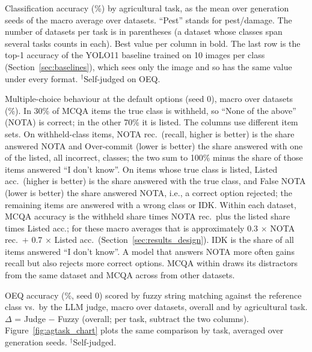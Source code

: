 \documentclass[10pt,letterpaper]{article}
\newcommand{\tablefont}{\footnotesize}
\begin{document}
\begin{table}[!tbp]
\centering
\caption{Classification accuracy (\%) by agricultural task, as the mean over generation seeds of the macro average over datasets. ``Pest'' stands for pest/damage. The number of datasets per task is in parentheses (a dataset whose classes span several tasks counts in each). Best value per column in bold. The last row is the top-1 accuracy of the YOLO11 baseline trained on 10 images per class (Section~\ref{sec:baselines}), which sees only the image and so has the same value under every format. $^\dagger$Self-judged on OEQ.}
\label{tab:agtask}
\renewcommand{\arraystretch}{1.2}
\tablefont

\end{table}

\begin{table}[!tbp]
\centering
\caption{Multiple-choice behaviour at the default options (seed 0), macro over datasets (\%). In 30\% of MCQA items the true class is withheld, so ``None of the above'' (NOTA) is correct; in the other 70\% it is listed. The columns use different item sets. On withheld-class items, NOTA rec.\ (recall, higher is better) is the share answered NOTA and Over-commit (lower is better) the share answered with one of the listed, all incorrect, classes; the two sum to 100\% minus the share of those items answered ``I don't know''. On items whose true class is listed, Listed acc.\ (higher is better) is the share answered with the true class, and False NOTA (lower is better) the share answered NOTA, i.e., a correct option rejected; the remaining items are answered with a wrong class or IDK. Within each dataset, MCQA accuracy is the withheld share times NOTA rec.\ plus the listed share times Listed acc.; for these macro averages that is approximately 0.3 $\times$ NOTA rec.\ $+$ 0.7 $\times$ Listed acc.\ (Section~\ref{sec:results_design}). IDK is the share of all items answered ``I don't know''. A model that answers NOTA more often gains recall but also rejects more correct options. MCQA within draws its distractors from the same dataset and MCQA across from other datasets.}
\label{tab:behaviour}
\renewcommand{\arraystretch}{1.2}
\tablefont

\end{table}

\begin{table}[!tbp]
\centering
\caption{OEQ accuracy (\%, seed 0) scored by fuzzy string matching against the reference class vs.\ by the LLM judge, macro over datasets, overall and by agricultural task. $\Delta$ = Judge $-$ Fuzzy (overall; per task, subtract the two columns). Figure~\ref{fig:agtask_chart} plots the same comparison by task, averaged over generation seeds. $^\dagger$Self-judged.}
\label{tab:judge}
\renewcommand{\arraystretch}{1.2}
\tablefont

\end{table}
\end{document}
